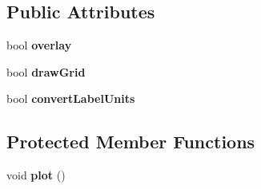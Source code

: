 \subsection*{Public Attributes}
\begin{DoxyCompactItemize}
\item 
\hypertarget{classProjectionAxes_af7f323bed1ddf6b125cf45bf8852d4c8}{bool {\bfseries overlay}}\label{classProjectionAxes_af7f323bed1ddf6b125cf45bf8852d4c8}

\item 
\hypertarget{classProjectionAxes_a094fc5c16540419ca3ded31d378790e1}{bool {\bfseries draw\-Grid}}\label{classProjectionAxes_a094fc5c16540419ca3ded31d378790e1}

\item 
\hypertarget{classProjectionAxes_a0dc4634471d11274ffea606ff2263a28}{bool {\bfseries convert\-Label\-Units}}\label{classProjectionAxes_a0dc4634471d11274ffea606ff2263a28}

\end{DoxyCompactItemize}
\subsection*{Protected Member Functions}
\begin{DoxyCompactItemize}
\item 
\hypertarget{classProjectionAxes_aa16be5ea3376a6aa96b09a5a00d0388a}{void {\bfseries plot} ()}\label{classProjectionAxes_aa16be5ea3376a6aa96b09a5a00d0388a}

\end{DoxyCompactItemize}
